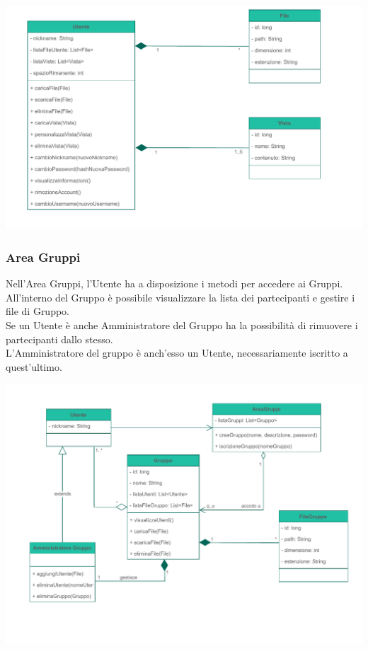 \begin{adjustwidth}{-2.5cm}{0cm}
\includegraphics[scale=1]{dominio/Dominio-Area Personale.drawio.pdf}
\end{adjustwidth}


\pagebreak
\subsubsection*{Area Gruppi}
{}
\vspace{0.5cm}
Nell'Area Gruppi, l'Utente ha a disposizione i metodi per accedere ai Gruppi.\\All'interno del Gruppo è possibile visualizzare la lista dei partecipanti e gestire i file di Gruppo.\\Se un Utente è anche Amministratore del Gruppo ha la possibilità di rimuovere i partecipanti dallo stesso.\\
L'Amministratore del gruppo è anch'esso un Utente, necessariamente iscritto a quest'ultimo.
\vspace{1cm}

\begin{adjustwidth}{-3.5cm}{0cm}
\includegraphics[scale=1]{dominio/Dominio-Area Gruppi.drawio.pdf}
\end{adjustwidth}

